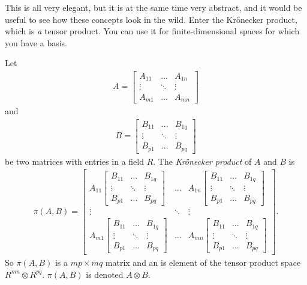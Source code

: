 \documentclass[english, 12pt]{article}
\begin{document}
This is all very elegant, but it is at the same time very abstract, and it would be useful to see how these concepts look in the wild.
Enter the Krönecker product, which is \emph{a} tensor product.
You can use it for finite-dimensional spaces for which you have a basis.
\begin{definition}
	Let
	\begin{align*}
		A =
		\begin{bmatrix}
			A_{11} & \dots & A_{1n}\\
			\vdots & \ddots & \vdots\\
			A_{m1} & \dots & A_{mn}
		\end{bmatrix}
	\end{align*}
	and
	\begin{align*}
		B =
		\begin{bmatrix}
			B_{11} & \dots & B_{1q}\\
			\vdots & \ddots & \vdots\\
			B_{p1} & \dots & B_{pq}
		\end{bmatrix}
	\end{align*}
	be two matrices with entries in a field $R$.
	The \emph{Krönecker product} of $A$ and $B$ is
	\begin{align*}
		\pi(A, B) =
		\begin{bmatrix}
			A_{11}
			\begin{bmatrix}
				B_{11} & \dots & B_{1q}\\
				\vdots & \ddots & \vdots\\
				B_{p1} & \dots & B_{pq}
			\end{bmatrix}
			& \dots &
			A_{1n}
			\begin{bmatrix}
				B_{11} & \dots & B_{1q}\\
				\vdots & \ddots & \vdots\\
				B_{p1} & \dots & B_{pq}
			\end{bmatrix}\\
			\vdots & \ddots & \vdots\\
			A_{m1}
			\begin{bmatrix}
				B_{11} & \dots & B_{1q}\\
				\vdots & \ddots & \vdots\\
				B_{p1} & \dots & B_{pq}
			\end{bmatrix}
			& \dots &
			A_{mn}
			\begin{bmatrix}
				B_{11} & \dots & B_{1q}\\
				\vdots & \ddots & \vdots\\
				B_{p1} & \dots & B_{pq}
			\end{bmatrix}
		\end{bmatrix}.
	\end{align*}
	So $\pi(A, B)$ is a $mp \times mq$ matrix and an is element of the tensor product space $R^{mn} \otimes R^{pq}$.
	$\pi(A, B)$ is denoted $A \otimes B$.
\end{definition}
\end{document}
